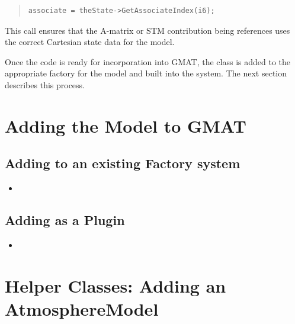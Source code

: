 \documentclass[letterpaper,10pt]{article}
\begin{document}
\begin{quote}
\begin{verbatim}
associate = theState->GetAssociateIndex(i6);
\end{verbatim}
\end{quote}

\noindent This call ensures that the A-matrix or STM contribution being
references uses the correct Cartesian state data for the model.

Once the code is ready for incorporation into GMAT, the class is added to the
appropriate factory for the model and built into the system.  The next section
describes this process. 

\section{Adding the Model to GMAT}

\subsection{Adding to an existing Factory system}

\begin{itemize}
\item 
\end{itemize}

\subsection{Adding as a Plugin}

\begin{itemize}
\item 
\end{itemize}

\section{Helper Classes: Adding an AtmosphereModel}
\end{document}
